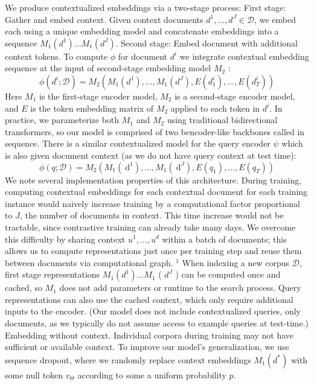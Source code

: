 We produce contextualized embeddings via a two-stage process:
First stage: Gather and embed context. Given context documents \(d^{1}, \ldots, d^{J} \in \mathcal{D}\), we embed each using a unique embedding model and concatenate embeddings into a sequence \(M_{1}\left(d^{1}\right) \ldots M_{1}\left(d^{J}\right)\).
Second stage: Embed document with additional context tokens. To compute \(\phi\) for document \(d^{i}\) we integrate contextual embedding sequence at the input of second-stage embedding model \(M_{2}\) :
\[
\phi\left(d^{i} ; \mathcal{D}\right)=M_{2}\left(M_{1}\left(d^{1}\right), \ldots, M_{1}\left(d^{J}\right), E\left(d_{1}^{i}\right), \ldots, E\left(d_{T}^{i}\right)\right)
\]
Here \(M_{1}\) is the first-stage encoder model, \(M_{2}\) is a second-stage encoder model, and \(E\) is the token embedding matrix of \(M_{2}\) applied to each token in \(d^{i}\). In practice, we parameterize both \(M_{1}\) and \(M_{2}\) using traditional bidirectional transformers, so our model is comprised of two bencoder-like backbones called in sequence.
There is a similar contextualized model for the query encoder \(\psi\) which is also given document context (as we do not have query context at test time):
\[
\phi\left(q ; \mathcal{D}\right)=M_{2}\left(M_{1}\left(\mathrm{~d}^{1}\right), \ldots, M_{1}\left(\mathrm{~d}^{J}\right), E\left(q_{1}\right), \ldots, E\left(q_{T}\right)\right)
\]
We note several implementation properties of this architecture. During training, computing contextual embeddings for each contextual document for each training instance would naively increase training by a computational factor proportional to \(J\), the number of documents in context. This time increase would not be tractable, since contrastive training can already take many days. We overcome this difficulty by sharing context \(u^{1}, \ldots, u^{d}\) within a batch of documents; this allows us to compute representations just once per training step and reuse them between documents via computational graph. \({ }^{1}\)
When indexing a new corpus \(\mathcal{D}\), first stage representations \(M_{1}\left(d^{1}\right) \ldots M_{1}\) ( \(d^{J}\) ) can be computed once and cached, so \(M_{1}\) does not add parameters or runtime to the search process. Query representations can also use the cached context, which only require additional inputs to the encoder. (Our model does not include contextualized queries, only documents, as we typically do not assume access to example queries at test-time.)
Embedding without context. Individual corpora during training may not have sufficient or available context. To improve our model's generalization, we use sequence dropout, where we randomly replace context embeddings \(M_{1}\left(d^{*}\right)\) with some null token \(v_{\Theta}\) according to some a uniform probability \(p\).
